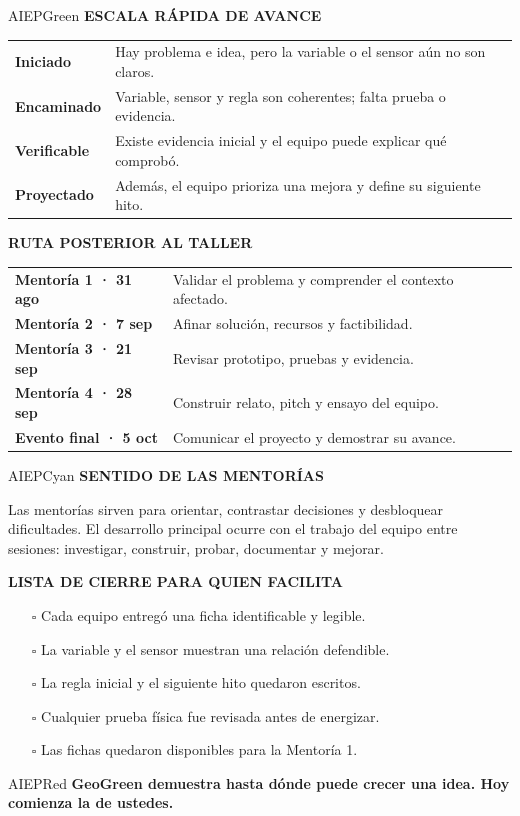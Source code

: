 \documentclass[10pt,a4paper]{article}
\newcommand{\labeltext}[1]{%
  {\scriptsize\bfseries\color{AIEPSlate}\MakeUppercase{#1}}\par\vspace{1.2mm}
}
\begin{document}
\begin{softcard}{AIEPGreen}
\labeltext{Escala rápida de avance}
\begin{tabularx}{\textwidth}{@{}L{28mm}Y@{}}
\textbf{Iniciado} & Hay problema e idea, pero la variable o el sensor aún no son claros.\\
\textbf{Encaminado} & Variable, sensor y regla son coherentes; falta prueba o evidencia.\\
\textbf{Verificable} & Existe evidencia inicial y el equipo puede explicar qué comprobó.\\
\textbf{Proyectado} & Además, el equipo prioriza una mejora y define su siguiente hito.\\
\end{tabularx}
\end{softcard}

\begin{card}
\labeltext{Ruta posterior al taller}
\begin{tabularx}{\textwidth}{@{}L{33mm}Y@{}}
\textbf{Mentoría 1 · 31 ago} & Validar el problema y comprender el contexto afectado.\\
\textbf{Mentoría 2 · 7 sep} & Afinar solución, recursos y factibilidad.\\
\textbf{Mentoría 3 · 21 sep} & Revisar prototipo, pruebas y evidencia.\\
\textbf{Mentoría 4 · 28 sep} & Construir relato, pitch y ensayo del equipo.\\
\textbf{Evento final · 5 oct} & Comunicar el proyecto y demostrar su avance.\\
\end{tabularx}
\end{card}

\begin{softcard}{AIEPCyan}
\labeltext{Sentido de las mentorías}
Las mentorías sirven para orientar, contrastar decisiones y desbloquear dificultades. El desarrollo
principal ocurre con el trabajo del equipo entre sesiones: investigar, construir, probar, documentar
y mejorar.
\end{softcard}

\begin{card}
\labeltext{Lista de cierre para quien facilita}
\begin{itemize}
  \item[$\square$] Cada equipo entregó una ficha identificable y legible.
  \item[$\square$] La variable y el sensor muestran una relación defendible.
  \item[$\square$] La regla inicial y el siguiente hito quedaron escritos.
  \item[$\square$] Cualquier prueba física fue revisada antes de energizar.
  \item[$\square$] Las fichas quedaron disponibles para la Mentoría 1.
\end{itemize}
\end{card}

\begin{softcard}{AIEPRed}
\centering
{\large\bfseries\color{AIEPNavy}GeoGreen demuestra hasta dónde puede crecer una idea. Hoy comienza la de ustedes.}
\end{softcard}
\end{document}
